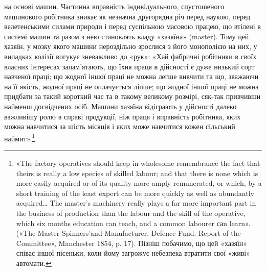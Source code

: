 на основі машин. Частинна вправність індивідуального,
спустошеного машинового робітника зникає як незначна другорядна
річ перед наукою, перед велетенськими силами природи
і перед суспільною масовою працею, що втілені в системі машин
та разом з нею становлять владу «хазяїна» (master). Тому цей хазяїн,
у мозку якого машини нероздільно зрослися з його монополією
на них, у випадках колізії вигукує зневажливо до «рук»:
«Хай фабричні робітники в своїх власних інтересах запам’ятають,
що їхня праця в дійсності є дуже низький сорт навченої
праці; що жодної іншої праці не можна легше вивчити та що,
зважаючи на її якість, жодної праці не оплачується ліпше; що
жодної іншої праці не можна придбати за такий короткий час та
в такому великому розмірі, сяк-так привчивши найменш досвідчених
осіб. Машини хазяїна відіграють у дійсності далеко важливішу
ролю в справі продукції, ніж праця і вправність робітника,
яких можна навчитися за шість місяців і яких може навчитися
кожен сільський наймит».\footnote{
«The factory operatives should keep in wholesome remembrance
the fact that theirs is really a low species of skilled labour; and that there
is none which is more easily acquired or of its quality more amply remunerated,
or which, by a short training of the least expert can be more quickly
as well as abundantly acquired\dots{} The master’s machinery really plays
a far more important part in the business of production than the labour
and the skill of the operative, which six months education can teach, and
a common labourer саn learn». («The Master Spinners’and Manufacturer,
Defence Fund. Report of the Committee», Manchester 1854, p. 17). Пізніш
побачимо, що цей «хазяїн» співає іншої пісеньки, коли йому загрожує
небезпека втратити свої «живі» автомати.
}

